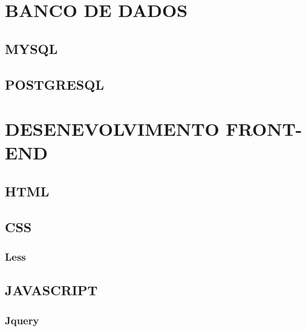 \documentclass[12pt,floatnumber=continuous,espaco=umemeio]{abnt}
\begin{document}
 
	
	\capa 
	\folhaderosto 
	 
	
  

	\indices

	
	
	
	
	
	
	
	\newpage
	
	\chapter{BANCO DE DADOS}
	\section{MYSQL}
	\section{POSTGRESQL}
	
	\chapter{DESENEVOLVIMENTO FRONT-END}
	\section{HTML}
	\section{CSS}
	\subsection{Less}
	\section{JAVASCRIPT}
	\subsection{Jquery}
\end{document}
